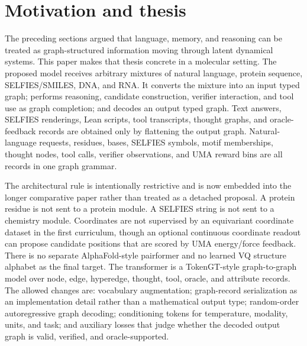 \documentclass[11pt]{article}
\newcommand{\1}{\mathbf{1}}
\begin{document}
\section{Motivation and thesis}

The preceding sections argued that language, memory, and reasoning can be treated as graph-structured information moving through latent dynamical systems. This paper makes that thesis concrete in a molecular setting. The proposed model receives arbitrary mixtures of natural language, protein sequence, SELFIES/SMILES, DNA, and RNA. It converts the mixture into an input typed graph; performs reasoning, candidate construction, verifier interaction, and tool use as graph completion; and decodes an output typed graph. Text answers, SELFIES renderings, Lean scripts, tool transcripts, thought graphs, and oracle-feedback records are obtained only by flattening the output graph. Natural-language requests, residues, bases, SELFIES symbols, motif memberships, thought nodes, tool calls, verifier observations, and UMA reward bins are all records in one graph grammar.

The architectural rule is intentionally restrictive and is now embedded into the longer comparative paper rather than treated as a detached proposal. A protein residue is not sent to a protein module. A SELFIES string is not sent to a chemistry module. Coordinates are not supervised by an equivariant coordinate dataset in the first curriculum, though an optional continuous coordinate readout can propose candidate positions that are scored by UMA energy/force feedback. There is no separate AlphaFold-style pairformer and no learned VQ structure alphabet as the final target. The transformer is a TokenGT-style graph-to-graph model over node, edge, hyperedge, thought, tool, oracle, and attribute records. The allowed changes are: vocabulary augmentation; graph-record serialization as an implementation detail rather than a mathematical output type; random-order autoregressive graph decoding; conditioning tokens for temperature, modality, units, and task; and auxiliary losses that judge whether the decoded output graph is valid, verified, and oracle-supported.
\end{document}
